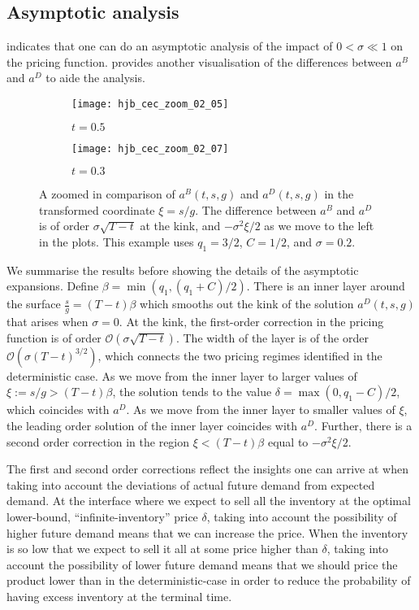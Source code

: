 \documentclass[main.tex]{subfiles}
\begin{document}
\subsection{Asymptotic analysis}\label{subsec:asymptotic_analysis}
 indicates that one can do an asymptotic analysis
of the impact of $0<\sigma \ll 1$ on the pricing
function.  provides another visualisation
of the differences between $a^B$ and $a^D$ to aide the analysis.
\begin{figure}[p]
  \centering
  \begin{subfigure}[b]{0.5\textwidth}
    \texttt{[image: hjb\_cec\_zoom\_02\_05]}
    \caption{$t = 0.5$}
  \end{subfigure}%
  \begin{subfigure}[b]{0.5\textwidth}
    \texttt{[image: hjb\_cec\_zoom\_02\_07]}
    \caption{$t=0.3$}
  \end{subfigure}
  \caption[A zoomed-in comparison of the Bellman and
  deterministic-case functions]{A zoomed in comparison of $a^B(t,s,g)$ and $a^D(t,s,g)$
    in the transformed coordinate $\xi=s/g$.
    The difference between $a^B$ and $a^D$ is of order
    $\sigma\sqrt{T-t}$ at the kink, and
    $-\sigma^2\xi/2$ as we move to the left in the
    plots.
    This example uses $q_1=3/2$, $C=1/2$, and $\sigma=0.2$.
  }\label{fig:hjb_cec_zoom}
\end{figure}

We summarise the results before showing the details of the asymptotic expansions.
Define $\beta=\min(q_1,(q_1+C)/2)$.
There is an inner layer around the surface $\frac{s}{g}=(T-t)\beta$ which
smooths out the kink of the solution $a^D(t,s,g)$ that arises when
$\sigma=0$. At the kink, the first-order correction in the pricing
function is of order $\mathcal{O}(\sigma\sqrt{T-t})$.
The width of the layer is of the order
$\mathcal{O}(\sigma{(T-t)}^{3/2})$, which connects the two pricing
regimes identified in the deterministic case.
As we move from the inner layer to larger values of
$\xi:=s/g>(T-t)\beta$, the solution
tends to the value $\delta=\max(0,q_1-C)/2$, which coincides with
$a^D$. As we move from the inner layer to smaller values of $\xi$,
the leading order solution of the inner layer coincides with $a^D$.
Further, there is a second order correction in the region
$\xi<(T-t)\beta$ equal to $-\sigma^2 \xi/2$.

The first and second order corrections reflect the insights one can
arrive at when taking into account the deviations of actual future
demand from expected demand.  At the interface where we expect to sell
all the inventory at the optimal lower-bound, ``infinite-inventory''
price $\delta$, taking into account the possibility of higher future
demand means that we can increase the price.  When the inventory is so
low that we expect to sell it all at some price higher than $\delta$,
taking into account the possibility of lower future demand means that
we should price the product lower than in the deterministic-case in
order to reduce the probability of having excess inventory at the
terminal time.
\end{document}
